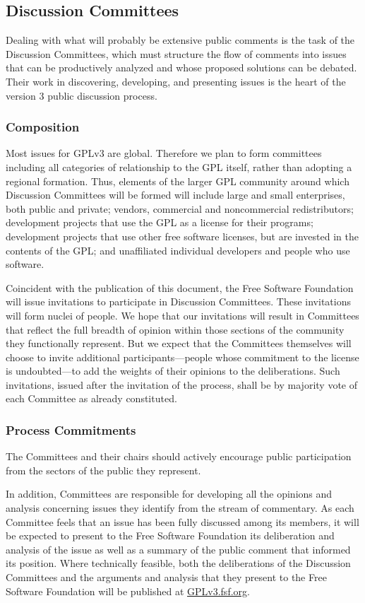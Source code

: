 \documentclass[a4paper,spanish,12pt]{book}
\begin{document}
\subsection{Discussion Committees}\label{DiscussionCommittees} Dealing
with what will probably be extensive public comments is the task of
the Discussion Committees, which must structure the flow of comments
into issues that can be productively analyzed and whose proposed
solutions can be debated.  Their work in discovering, developing, and
presenting issues is the heart of the version 3 public discussion
process.

\subsubsection{Composition} Most issues for GPLv3 are global.  Therefore we
plan to form committees including all categories of relationship to the
GPL itself, rather than adopting a regional formation.  Thus, elements
of the larger GPL community around which Discussion Committees will be
formed will include large and small enterprises, both public and
private; vendors, commercial and noncommercial redistributors;
development projects that use the GPL as a license for their programs;
development projects that use other free software licenses, but are
invested in the contents of the GPL; and unaffiliated individual
developers and people who use software.

Coincident with the publication of this document, the Free Software
Foundation will issue invitations to participate in Discussion
Committees.  These invitations will form nuclei of people.  We hope
that our invitations will result in Committees that reflect the full
breadth of opinion within those sections of the community they
functionally represent.  But we expect that the Committees themselves
will choose to invite additional participants---people whose
commitment to the license is undoubted---to add the weights of their
opinions to the deliberations.  Such invitations, issued after the
invitation of the process, shall be by majority vote of each Committee
as already constituted.

\subsubsection{Process Commitments} The Committees and their chairs should
actively encourage public participation from the sectors of the public
they represent.

In addition, Committees are responsible for developing all the
opinions and analysis concerning issues they identify from the stream
of commentary.  As each Committee feels that an issue has been fully
discussed among its members, it will be expected to present to the
Free Software Foundation its deliberation and analysis of the issue as
well as a summary of the public comment that informed its position.
Where technically feasible, both the deliberations of the Discussion
Committees and the arguments and analysis that they present to the
Free Software Foundation will be published at \url{GPLv3.fsf.org}.
\end{document}
